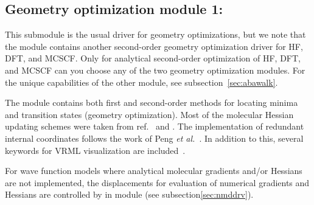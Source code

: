 \subsection{Geometry optimization module 1: }\label{subsec:minimize}

This submodule is the usual driver for geometry optimizations,
but we note that the  module contains another second-order
geometry optimization driver for HF, DFT, and MCSCF.
Only for analytical second-order optimization of HF, DFT, and MCSCF can you choose
any of the two geometry optimization modules.
For the unique capabilities of the other module, see subsection~\ref{sec:abawalk}.

The  module contains both first and second-order methods
for locating minima and transition states (geometry optimization).
Most of the molecular Hessian updating schemes were taken from
ref.~\cite{thkrprt95} and \cite{Fletcher}.
The implementation of redundant internal coordinates
follows the work of Peng {\it et al.\/}~\cite{cppyahbsmjfjcc17}.
In addition to this, several keywords for VRML visualization are included~\cite{VRML}.

For wave function models where analytical molecular gradients and/or Hessians are not implemented,
the displacements for evaluation of numerical gradients and Hessians
are controlled by  in module  (see subsection\ref{sec:nmddrv}).

